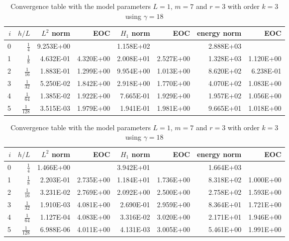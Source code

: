 \begin{table}
  \caption{\label{tab:ex1_order:a} Convergence table with the model parameters $L=1$, $m=7$ and $r=3$ with order $k=2$ using $ \gamma = 9$}
  \begin{tabular}{rrrrrrrr}
    \hline\hline
    $i$&\textbf{$h/{L} $} & \textbf{$L^2$ norm} & \textbf{EOC} & \textbf{$H_1$ norm} & \textbf{EOC} & \textbf{energy norm} & \textbf{EOC} \\\hline
    0&$\frac{1}{4}$ & 9.253E+00 &  & 1.158E+02 &  & 2.888E+03 &  \\
    1&$\frac{1}{8}$ & 4.632E-01 & 4.320E+00 & 2.008E+01 & 2.527E+00 & 1.328E+03 & 1.120E+00 \\
    2&$\frac{1}{16}$ & 1.883E-01 & 1.299E+00 & 9.954E+00 & 1.013E+00 & 8.620E+02 & 6.238E-01 \\
    3&$\frac{1}{32}$ & 5.250E-02 & 1.842E+00 & 2.918E+00 & 1.770E+00 & 4.070E+02 & 1.083E+00 \\
    4&$\frac{1}{64}$ & 1.385E-02 & 1.922E+00 & 7.665E-01 & 1.929E+00 & 1.957E+02 & 1.056E+00 \\
    5&$\frac{1}{128}$ & 3.515E-03 & 1.979E+00 & 1.941E-01 & 1.981E+00 & 9.665E+01 & 1.018E+00 \\\hline\hline
  \end{tabular}
  \caption{\label{tab:ex1_order:b} Convergence table with the model parameters $L=1$, $m=7$ and $r=3$ with order $k=3$ using $ \gamma = 18$ }
  \begin{tabular}{rrrrrrrr}
    \hline\hline
    $i$&\textbf{$h/{L} $} & \textbf{$L^2$ norm} & \textbf{EOC} & \textbf{$H_1$ norm} & \textbf{EOC} & \textbf{energy norm} & \textbf{EOC} \\\hline
    0&$\frac{1}{4}$ & 1.466E+00 &  & 3.942E+01 &  & 1.664E+03 &  \\
    1&$\frac{1}{8}$ & 2.203E-01 & 2.735E+00 & 1.184E+01 & 1.736E+00 & 8.318E+02 & 1.000E+00 \\
    2&$\frac{1}{16}$ & 3.231E-02 & 2.769E+00 & 2.092E+00 & 2.500E+00 & 2.758E+02 & 1.593E+00 \\
    3&$\frac{1}{32}$ & 1.910E-03 & 4.081E+00 & 2.690E-01 & 2.959E+00 & 8.364E+01 & 1.721E+00 \\
    4&$\frac{1}{64}$ & 1.127E-04 & 4.083E+00 & 3.316E-02 & 3.020E+00 & 2.171E+01 & 1.946E+00 \\
    5&$\frac{1}{128}$ & 6.988E-06 & 4.011E+00 & 4.131E-03 & 3.005E+00 & 5.461E+00 & 1.991E+00 \\\hline\hline
  \end{tabular}


\end{table}
